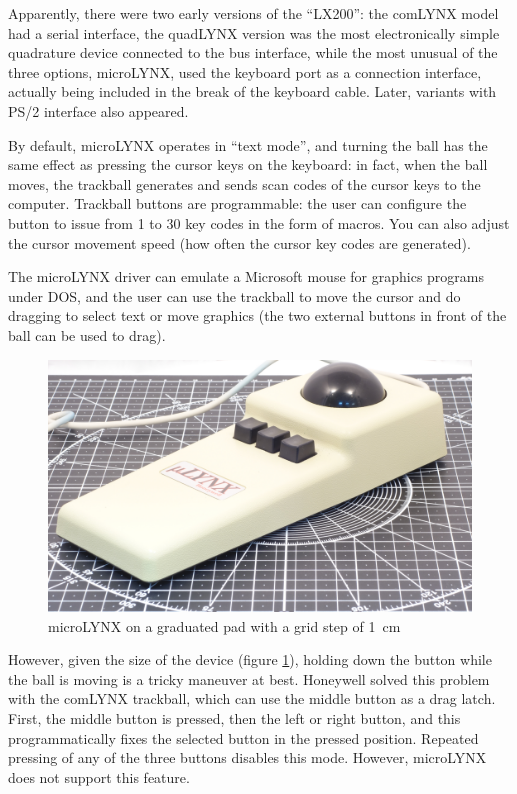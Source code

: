 \documentclass[11pt, a4paper]{article}
\begin{document}
Apparently, there were two early versions of the “LX200”: the comLYNX model had a serial \cite{comlynx} interface, the quadLYNX version was the most electronically simple quadrature device connected to the bus interface, while the most unusual of the three options, microLYNX, used the keyboard port as a connection interface, actually being included in the break of the keyboard cable. Later, variants with PS/2 interface also appeared.

By default, microLYNX operates in “text mode”, and turning the ball has the same effect as pressing the cursor keys on the keyboard: in fact, when the ball moves, the trackball generates and sends scan codes of the cursor keys to the computer. Trackball buttons are programmable: the user can configure the button to issue from 1 to 30 key codes in the form of macros. You can also adjust the cursor movement speed (how often the cursor key codes are generated).

The microLYNX driver can emulate a Microsoft mouse for graphics programs under DOS, and the user can use the trackball to move the cursor and do dragging to select text or move graphics (the two external buttons in front of the ball can be used to drag).

\begin{figure}[h]
    \centering
    \includegraphics[scale=0.4]{1986_honeywell_microlynx_trackball/size.jpg}
    \caption{microLYNX on a graduated pad with a grid step of 1~cm}
    \label{fig:microLYNXSize}
\end{figure}

However, given the size of the device (figure \ref{fig:microLYNXSize}), holding down the button while the ball is moving is a tricky maneuver at best. Honeywell solved this problem with the comLYNX trackball, which can use the middle button as a \cite{comlynx} drag latch. First, the middle button is pressed, then the left or right button, and this programmatically fixes the selected button in the pressed position. Repeated pressing of any of the three buttons disables this mode. However, microLYNX does not support this feature.
\end{document}
